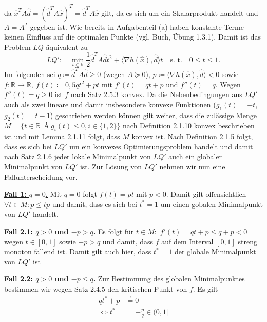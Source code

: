 \documentclass[ngerman, a4paper,12pt]{article}
\begin{document}
da $\hat{x}^TA\hat{d} = (\hat{d}^TA\hat{x})^T =  \hat{d}^TA\hat{x}$ gilt, da es sich um ein Skalarprodukt handelt und $A=A^T$ gegeben ist. Wie bereits in Aufgabenteil (a) haben konstante Terme keinen Einfluss auf die optimalen Punkte (vgl. Buch, Übung 1.3.1). Damit ist das Problem $LQ$ äquivalent zu
\begin{equation*}
	LQ': \quad \min_{t \in \mathbb{R}} \frac{1}{2} \hat{d}^TA\hat{d}t^2 + \langle \nabla h(\hat{x}), \hat{d} \rangle t \quad \text{s. t.} \quad 0\leq t \leq 1.
\end{equation*}
Im folgenden sei $q \coloneqq \hat{d}^TA\hat{d}\geq 0$ (wegen $A \succeq 0$), $p \coloneqq \langle \nabla h(\hat{x}), \hat{d} \rangle < 0$ sowie $f: \mathbb{R} \rightarrow \mathbb{R}, \ f(t) \coloneqq 0,5qt^2+pt$ mit $f'(t)=qt+p$ und $f''(t)=q$. Wegen $f''(t)=q\geq 0$ ist $f$ nach Satz 2.5.3 konvex. Da die Nebenbedingungen aus $LQ'$ auch als zwei lineare und damit insbesondere konvexe Funktionen ($g_1(t)=-t$, $g_2(t)=t-1$) geschrieben werden können gilt weiter, dass die zulässige Menge $M = \{t \in \mathbb{R} \ |Â \ g_i(t) \leq 0, i\in \{1,2\} \}$ nach Definition 2.1.10 konvex beschrieben ist und mit Lemma 2.1.11 folgt, dass $M$ konvex ist. Nach Definition 2.1.5 folgt, dass es sich bei $LQ'$ um ein konvexes Optimierungsproblem handelt und damit nach Satz 2.1.6 jeder lokale Minimalpunkt von $LQ'$ auch ein globaler Minimalpunkt von $LQ'$ ist. Zur Lösung von $LQ'$ nehmen wir nun eine Fallunterscheidung vor. \par
\textbf{\underline{Fall 1: $q = 0$.}}
Mit $q=0$ folgt $f(t)=pt$ mit $p<0$. Damit gilt offensichtlich $\forall t \in M: p \leq tp$ und damit, dass es sich bei $t^*=1$ um einen gobalen Minimalpunkt von $LQ'$ handelt. \par
\textbf{\underline{Fall 2.1: $q > 0$ und $-p > q$.}} Es folgt für $t \in M:$ $f'(t)=qt+p \leq q+p < 0$ wegen $t \in [0,1]$ sowie $-p > q$ und damit, dass $f$ auf dem Interval $[0,1]$ streng monoton fallend ist. Damit gilt auch hier, dass $t^*=1$ der globale Minimalpunkt von $LQ'$ ist %
\par
\textbf{\underline{Fall 2.2: $q > 0$ und $-p \leq q$.}} Zur Bestimmung des globalen Minimalpunktes bestimmen wir wegen Satz 2.4.5 den kritischen Punkt von $f$. Es gilt
\begin{equation*}
	\begin{split}
		qt^*+p &\stackrel{!}{=} 0 \\
	\Leftrightarrow	t^* &= -\frac{p}{q} \in (0,1]
	\end{split}
\end{equation*}
\end{document}
